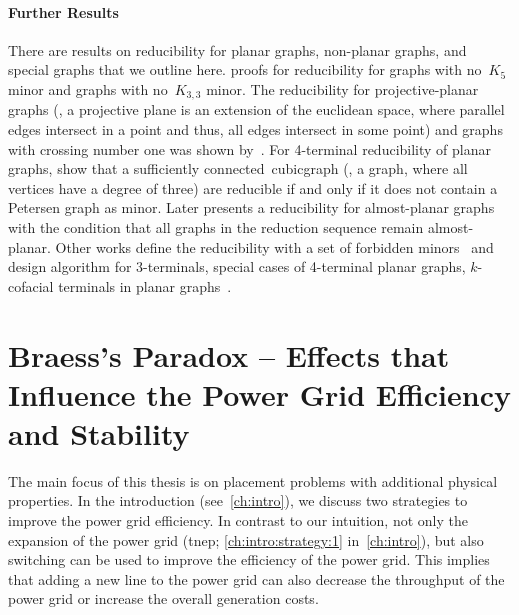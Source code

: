 \paragraph{Further Results}
% 
There are results on reducibility for planar graphs, non-planar graphs, and
special graphs that we outline here. \textcite{Git91} proofs for reducibility
for graphs with no~$K_5$ minor and graphs with no~$K_{3,3}$ minor. The
reducibility for projective-planar graphs (\ie, a projective plane is an
extension of the euclidean space, where parallel edges intersect in a point and
thus, all edges intersect in some point) and graphs with crossing number one was
shown by~\textcite{Arc00}. For 4-terminal reducibility of planar graphs,
\textcite{Demasi:2015:FTP:2722129.2722244} show that a sufficiently
connected~\gls{cubicgraph} (\ie, a graph, where all vertices have a degree of
three) are reducible if and only if it does not contain a Petersen graph as
minor. Later \textcite{Wag15} presents a reducibility for almost-planar graphs
with the condition that all graphs in the reduction sequence remain
almost-planar. Other works define the reducibility with a set of forbidden
minors~\parencite{DBLP:journals/jgt/Yu04a,DBLP:journals/combinatorics/Yu06} and
design algorithm for 3-terminals, special cases of 4-terminal planar graphs,
$k$-cofacial terminals in planar graphs~\parencite{Git91,doi:10.1002/net.20399}.
% 
% 
%         
% 
\section{Braess's Paradox -- Effects that Influence the Power Grid Efficiency
and Stability}
\label{ch:related-work:sec:braess-paradox}
% 
The main focus of this thesis is on placement problems with additional physical
properties. In the introduction (see~\cref{ch:intro}), we discuss two strategies
to improve the power grid efficiency. In contrast to our intuition, not only the
expansion of the power grid (\gls{tnep}; \cref{ch:intro:strategy:1}
in~\cref{ch:intro}), but also switching can be used to improve the efficiency of
the power grid. This implies that adding a new line to the power grid can also
decrease the throughput of the power grid or increase the overall generation
costs.

